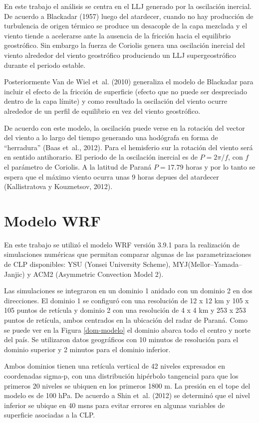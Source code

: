 \documentclass[12pt,spanish,oneside, a4paper]{book}
\begin{document}
En este trabajo el análisis se centra en el LLJ generado por la
oscilación inercial. De acuerdo a Blackadar (1957) luego del atardecer,
cuando no hay producción de turbulencia de origen térmico se produce un
desacople de la capa mezclada y el viento tiende a acelerarse ante la
ausencia de la fricción hacia el equilibrio geostrófico. Sin embargo la
fuerza de Coriolis genera una oscilación inercial del viento alrededor
del viento geostrófico produciendo un LLJ supergeostrófico durante el
periodo estable.

Posteriormente Van de Wiel et~al. (2010) generaliza el modelo de
Blackadar para incluir el efecto de la fricción de superficie (efecto
que no puede ser despreciado dentro de la capa límite) y como resultado
la oscilación del viento ocurre alrededor de un perfil de equilibrio en
vez del viento geostrófico.

De acuerdo con este modelo, la oscilación puede verse en la rotación del
vector del viento a lo largo del tiempo generando una hodógrafa en forma
de ``herradura'' (Baas et~al., 2012). Para el hemisferio sur la rotación
del viento será en sentido antihorario. El periodo de la oscilación
inercial es de \(P = 2\pi/f\), con \(f\) el parámetro de Coriolis. A la
latitud de Paraná \(P = 17.79\) horas y por lo tanto se espera que el
máximo viento ocurra unas 9 horas depues del atardecer (Kallistratova y
Kouznetsov, 2012).

\section{Modelo WRF}\label{modelo-wrf}

En este trabajo se utilizó el modelo WRF versión 3.9.1 para la
realización de simulaciones numéricas que permitan comparar algunas de
las parametrizaciones de CLP disponibles: YSU (Yonsei University
Scheme), MYJ(Mellor--Yamada--Janjic) y ACM2 (Asymmetric Convection Model
2).

Las simulaciones se integraron en un dominio 1 anidado con un dominio 2
en dos direcciones. El dominio 1 se configuró con una resolución de 12 x
12 km y 105 x 105 puntos de retícula y dominio 2 con una resolución de 4
x 4 km y 253 x 253 puntos de retícula, ambos centrados en la ubicación
del radar de Paraná. Como se puede ver en la Figura \ref{dom-modelo} el
dominio abarca todo el centro y norte del país. Se utilizaron datos
geográficos con 10 minutos de resolución para el dominio superior y 2
minutos para el dominio inferior.

Ambos dominios tienen una retícula vertical de 42 niveles expresados en
coordenadas sigma-p, con una distribución hipérbolo tangencial para que
los primeros 20 niveles se ubiquen en los primeros 1800 m. La presión en
el tope del modelo es de 100 hPa. De acuerdo a Shin et~al. (2012) se
determinó que el nivel inferior se ubique en 40 msns para evitar errores
en algunas variables de superficie asociadas a la CLP.
\end{document}
